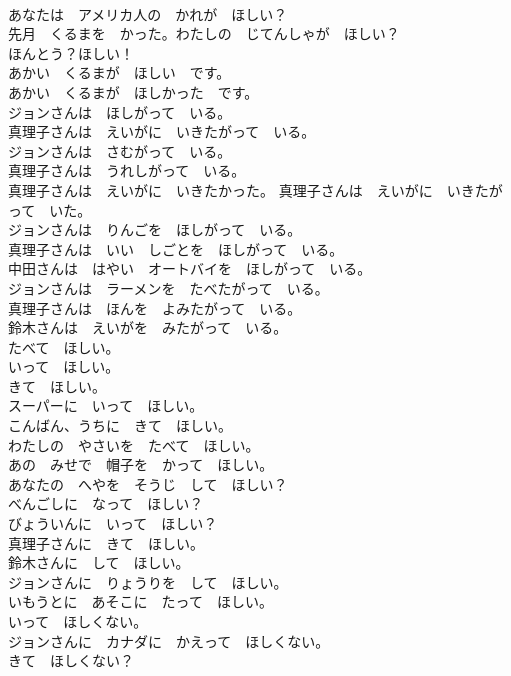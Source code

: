 \documentclass[8pt]{extreport}
\begin{document}
\begin{CJK}{UTF8}{min}
\\	あなたは　アメリカ人の　かれが　ほしい？	
\\	先月　くるまを　かった。わたしの　じてんしゃが　ほしい？	
\\	ほんとう？ほしい！	
\\	あかい　くるまが　ほしい　です。	
\\	あかい　くるまが　ほしかった　です。	
\\	ジョンさんは　ほしがって　いる。	
\\	真理子さんは　えいがに　いきたがって　いる。	
\\	ジョンさんは　さむがって　いる。	
\\	真理子さんは　うれしがって　いる。	
\\	真理子さんは　えいがに　いきたかった。 真理子さんは　えいがに　いきたがって　いた。	
\\	ジョンさんは　りんごを　ほしがって　いる。	
\\	真理子さんは　いい　しごとを　ほしがって　いる。	
\\	中田さんは　はやい　オートバイを　ほしがって　いる。	
\\	ジョンさんは　ラーメンを　たべたがって　いる。	
\\	真理子さんは　ほんを　よみたがって　いる。	
\\	鈴木さんは　えいがを　みたがって　いる。	
\\	たべて　ほしい。	
\\	いって　ほしい。	
\\	きて　ほしい。	
\\	スーパーに　いって　ほしい。	
\\	こんばん、うちに　きて　ほしい。	
\\	わたしの　やさいを　たべて　ほしい。	
\\	あの　みせで　帽子を　かって　ほしい。	
\\	あなたの　へやを　そうじ　して　ほしい？	
\\	べんごしに　なって　ほしい？	
\\	びょういんに　いって　ほしい？	
\\	真理子さんに　きて　ほしい。	
\\	鈴木さんに　して　ほしい。	
\\	ジョンさんに　りょうりを　して　ほしい。	
\\	いもうとに　あそこに　たって　ほしい。	
\\	いって　ほしくない。	
\\	ジョンさんに　カナダに　かえって　ほしくない。	
\\	きて　ほしくない？	

\end{CJK}
\end{document}
